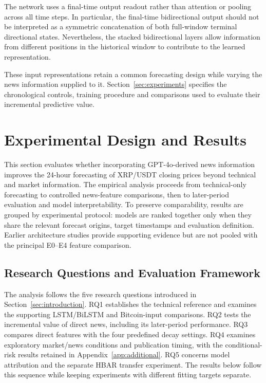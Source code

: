 The network uses a final-time output readout rather than attention or pooling across all time steps. In particular, the final-time bidirectional output should not be interpreted as a symmetric concatenation of both full-window terminal directional states. Nevertheless, the stacked bidirectional layers allow information from different positions in the historical window to contribute to the learned representation.


These input representations retain a common forecasting design while varying the news information supplied to it. Section~\ref{sec:experiments} specifies the chronological controls, training procedure and comparisons used to evaluate their incremental predictive value.


\section{Experimental Design and Results}
\label{sec:experiment-evaluation}
\label{sec:experiments}

This section evaluates whether incorporating GPT-4o-derived news information improves the 24-hour forecasting of XRP/USDT closing prices beyond technical and market information. The empirical analysis proceeds from technical-only forecasting to controlled news-feature comparisons, then to later-period evaluation and model interpretability. To preserve comparability, results are grouped by experimental protocol: models are ranked together only when they share the relevant forecast origins, target timestamps and evaluation definition. Earlier architecture studies provide supporting evidence but are not pooled with the principal E0--E4 feature comparison.

\subsection{Research Questions and Evaluation Framework}
\label{subsec:research-questions}

The analysis follows the five research questions introduced in Section~\ref{sec:introduction}. RQ1 establishes the technical reference and examines the supporting LSTM/BiLSTM and Bitcoin-input comparisons. RQ2 tests the incremental value of direct news, including its later-period performance. RQ3 compares direct features with the four predefined decay settings. RQ4 examines exploratory market/news conditions and publication timing, with the conditional-risk results retained in Appendix~\ref{app:additional}. RQ5 concerns model attribution and the separate HBAR transfer experiment. The results below follow this sequence while keeping experiments with different fitting targets separate.

